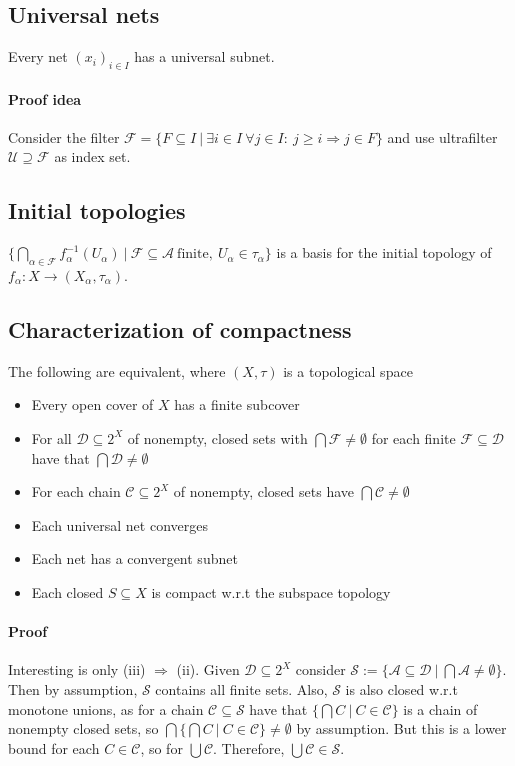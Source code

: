 \documentclass{scrartcl}
\begin{document}
\subsection{Universal nets}
Every net $(x_i)_{i \in I}$ has a universal subnet.
\paragraph{Proof idea} 
Consider the filter $\mathcal{F} = \{F \subseteq I \ | \ \exists i \in I \ \forall j \in I: \ j \geq i \Rightarrow j \in F\}$ and use ultrafilter $\mathcal{U} \supseteq \mathcal{F}$ as index set.

\subsection{Initial topologies}
$\{ \bigcap_{\alpha \in \mathcal{F}} f_\alpha^{-1}(U_\alpha) \ | \ \mathcal{F} \subseteq \mathcal{A} \ \text{finite}, \ U_\alpha \in \tau_\alpha \}$ is a basis for the initial topology of $f_\alpha: X \to (X_\alpha, \tau_\alpha)$.

\subsection{Characterization of compactness}
The following are equivalent, where $(X, \tau)$ is a topological space
\begin{itemize}
    \item Every open cover of $X$ has a finite subcover
    \item For all $\mathcal{D} \subseteq 2^X$ of nonempty, closed sets with $\bigcap \mathcal{F} \neq \emptyset$ for each finite $\mathcal{F} \subseteq \mathcal{D}$ have that $\bigcap \mathcal{D} \neq \emptyset$
    \item For each chain $\mathcal{C} \subseteq 2^X$ of nonempty, closed sets have $\bigcap \mathcal{C} \neq \emptyset$
    \item Each universal net converges
    \item Each net has a convergent subnet
    \item Each closed $S \subseteq X$ is compact w.r.t the subspace topology
\end{itemize}
\paragraph{Proof} Interesting is only (iii) $\Rightarrow$ (ii). Given $\mathcal{D} \subseteq 2^X$ consider $\mathcal{S} := \{\mathcal{A} \subseteq \mathcal{D} \ | \ \bigcap \mathcal{A} \neq \emptyset \}$. Then by assumption, $\mathcal{S}$ contains all finite sets.
Also, $\mathcal{S}$ is also closed w.r.t monotone unions, as for a chain $\mathcal{C} \subseteq \mathcal{S}$ have that $\{ \bigcap C \ | \ C \in \mathcal{C} \}$ is a chain of nonempty closed sets, so $\bigcap \{ \bigcap C \ | \ C \in \mathcal{C} \} \neq \emptyset$ by assumption. But this is a lower bound for each $C \in \mathcal{C}$, so for $\bigcup \mathcal{C}$. Therefore, $\bigcup \mathcal{C} \in \mathcal{S}$.
\end{document}
